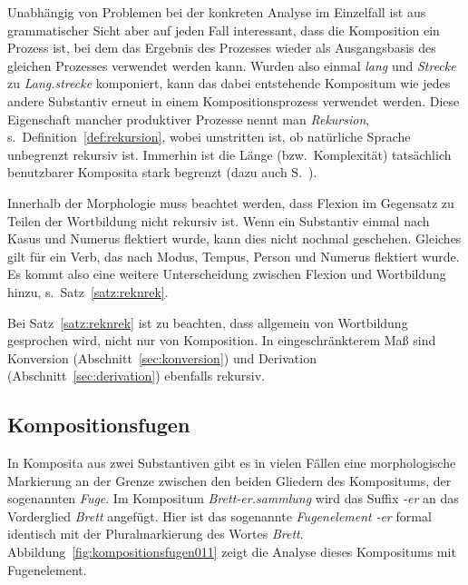 Unabhängig von Problemen bei der konkreten Analyse im Einzelfall ist aus grammatischer Sicht aber auf jeden Fall interessant, dass die Komposition ein Prozess ist, bei dem das Ergebnis des Prozesses wieder als Ausgangsbasis des gleichen Prozesses verwendet werden kann.
Wurden also einmal \textit{lang} und \textit{Strecke} zu \textit{Lang.strecke} komponiert, kann das dabei entstehende Kompositum wie jedes andere Substantiv erneut in einem Kompositionsprozess verwendet werden.
Diese Eigenschaft mancher produktiver Prozesse nennt man \textit{Rekursion}, s.\ Definition~\ref{def:rekursion}, wobei umstritten ist, ob natürliche Sprache unbegrenzt rekursiv ist.
Immerhin ist die Länge (bzw.\ Komplexität) tatsächlich benutzbarer Komposita stark begrenzt (dazu auch S.~\pageref{abs:syntaktischestruktur021}).


Innerhalb der Morphologie muss beachtet werden, dass Flexion im Gegensatz zu Teilen der Wortbildung nicht rekursiv ist.
Wenn ein Substantiv einmal nach Kasus und Numerus flektiert wurde, kann dies nicht nochmal geschehen.
Gleiches gilt für ein Verb, das nach Modus, Tempus, Person und Numerus flektiert wurde.
Es kommt also eine weitere Unterscheidung zwischen Flexion und Wortbildung hinzu, s.\ Satz~\ref{satz:reknrek}.


Bei Satz~\ref{satz:reknrek} ist zu beachten, dass allgemein von Wortbildung gesprochen wird, nicht nur von Komposition.
In eingeschränkterem Maß sind Konversion (Abschnitt~\ref{sec:konversion}) und Derivation (Abschnitt~\ref{sec:derivation}) ebenfalls rekursiv.

\subsection{Kompositionsfugen}
\label{sec:kompositionsfugen}


In Komposita aus zwei Substantiven gibt es in vielen Fällen eine morphologische Markierung an der Grenze zwischen den beiden Gliedern des Kompositums, der sogenannten \textit{Fuge}.
Im Kompositum \textit{Brett-er.sammlung} wird das Suffix \textit{-er} an das Vorderglied \textit{Brett} angefügt.
Hier ist das sogenannte \textit{Fugenelement} \textit{-er} formal identisch mit der Pluralmarkierung des Wortes \textit{Brett}.
Abbildung~\ref{fig:kompositionsfugen011} zeigt die Analyse dieses Kompositums mit Fugenelement.

